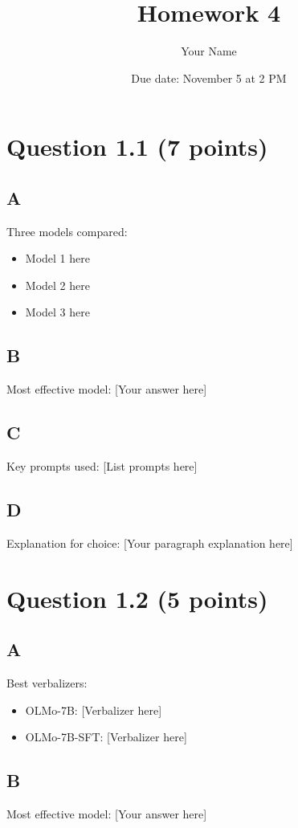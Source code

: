 \documentclass{article}
\title{Homework 4}
\author{Your Name}
\date{Due date: November 5 at 2 PM}
\begin{document}
\maketitle

\section*{Question 1.1 (7 points)}

\subsection*{A}
Three models compared:
\begin{itemize}
    \item Model 1 here
    \item Model 2 here
    \item Model 3 here
\end{itemize}

\subsection*{B}
Most effective model: [Your answer here]

\subsection*{C}
Key prompts used: [List prompts here]

\subsection*{D}
Explanation for choice: [Your paragraph explanation here]

\section*{Question 1.2 (5 points)}

\subsection*{A}
Best verbalizers:
\begin{itemize}
    \item OLMo-7B: [Verbalizer here]
    \item OLMo-7B-SFT: [Verbalizer here]
\end{itemize}

\subsection*{B}
Most effective model: [Your answer here]
\end{document}
